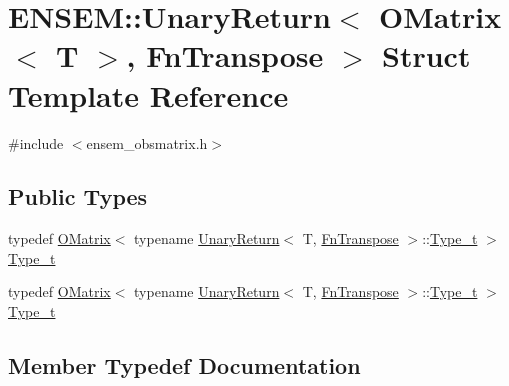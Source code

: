 \hypertarget{structENSEM_1_1UnaryReturn_3_01OMatrix_3_01T_01_4_00_01FnTranspose_01_4}{}\section{E\+N\+S\+EM\+:\+:Unary\+Return$<$ O\+Matrix$<$ T $>$, Fn\+Transpose $>$ Struct Template Reference}
\label{structENSEM_1_1UnaryReturn_3_01OMatrix_3_01T_01_4_00_01FnTranspose_01_4}


{\ttfamily \#include $<$ensem\+\_\+obsmatrix.\+h$>$}

\subsection*{Public Types}
\begin{DoxyCompactItemize}
\item 
typedef \mbox{\hyperlink{classENSEM_1_1OMatrix}{O\+Matrix}}$<$ typename \mbox{\hyperlink{structENSEM_1_1UnaryReturn}{Unary\+Return}}$<$ T, \mbox{\hyperlink{structENSEM_1_1FnTranspose}{Fn\+Transpose}} $>$\+::\mbox{\hyperlink{structENSEM_1_1UnaryReturn_3_01OMatrix_3_01T_01_4_00_01FnTranspose_01_4_a5baf7be8d88ac60f5375088eb7463444}{Type\+\_\+t}} $>$ \mbox{\hyperlink{structENSEM_1_1UnaryReturn_3_01OMatrix_3_01T_01_4_00_01FnTranspose_01_4_a5baf7be8d88ac60f5375088eb7463444}{Type\+\_\+t}}
\item 
typedef \mbox{\hyperlink{classENSEM_1_1OMatrix}{O\+Matrix}}$<$ typename \mbox{\hyperlink{structENSEM_1_1UnaryReturn}{Unary\+Return}}$<$ T, \mbox{\hyperlink{structENSEM_1_1FnTranspose}{Fn\+Transpose}} $>$\+::\mbox{\hyperlink{structENSEM_1_1UnaryReturn_3_01OMatrix_3_01T_01_4_00_01FnTranspose_01_4_a5baf7be8d88ac60f5375088eb7463444}{Type\+\_\+t}} $>$ \mbox{\hyperlink{structENSEM_1_1UnaryReturn_3_01OMatrix_3_01T_01_4_00_01FnTranspose_01_4_a5baf7be8d88ac60f5375088eb7463444}{Type\+\_\+t}}
\end{DoxyCompactItemize}


\subsection{Member Typedef Documentation}
\mbox{\label{structENSEM_1_1UnaryReturn_3_01OMatrix_3_01T_01_4_00_01FnTranspose_01_4_a5baf7be8d88ac60f5375088eb7463444}} 
